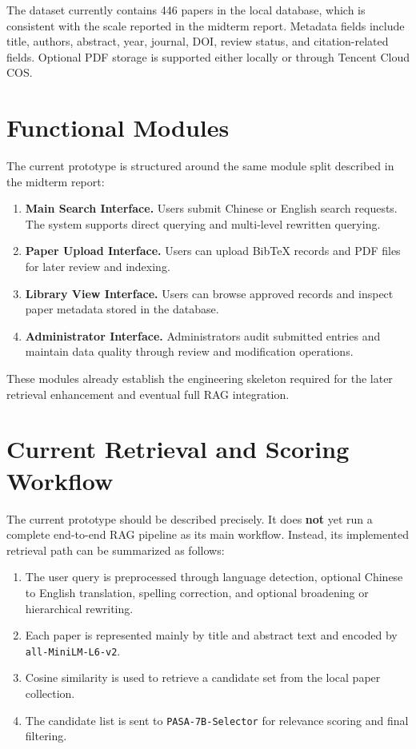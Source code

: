\documentclass[11pt,a4paper,oneside]{report}
\begin{document}
The dataset currently contains 446 papers in the local database, which is consistent
with the scale reported in the midterm report. Metadata fields include title, authors,
abstract, year, journal, DOI, review status, and citation-related fields. Optional
PDF storage is supported either locally or through Tencent Cloud COS.

\section{Functional Modules}

The current prototype is structured around the same module split described in the
midterm report:

\begin{enumerate}
  \item \textbf{Main Search Interface.} Users submit Chinese or English search requests.
  The system supports direct querying and multi-level rewritten querying.
  \item \textbf{Paper Upload Interface.} Users can upload BibTeX records and PDF files for
  later review and indexing.
  \item \textbf{Library View Interface.} Users can browse approved records and inspect
  paper metadata stored in the database.
  \item \textbf{Administrator Interface.} Administrators audit submitted entries and
  maintain data quality through review and modification operations.
\end{enumerate}

These modules already establish the engineering skeleton required for the later
retrieval enhancement and eventual full RAG integration.

\section{Current Retrieval and Scoring Workflow}

The current prototype should be described precisely. It does \textbf{not} yet run a
complete end-to-end RAG pipeline as its main workflow. Instead, its implemented
retrieval path can be summarized as follows:

\begin{enumerate}
  \item The user query is preprocessed through language detection, optional Chinese to
  English translation, spelling correction, and optional broadening or hierarchical
  rewriting.
  \item Each paper is represented mainly by title and abstract text and encoded by
  \texttt{all-MiniLM-L6-v2}.
  \item Cosine similarity is used to retrieve a candidate set from the local paper
  collection.
  \item The candidate list is sent to \texttt{PASA-7B-Selector} for relevance scoring and
  final filtering.
\end{enumerate}
\end{document}
